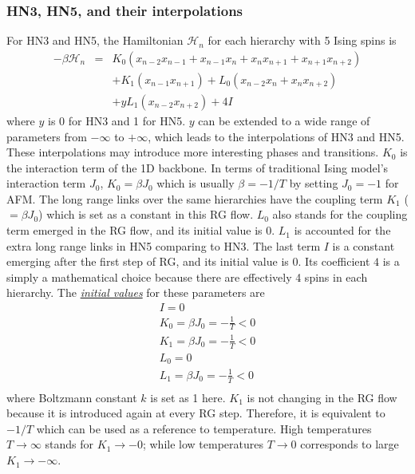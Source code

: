 \subsubsection{HN3, HN5, and their interpolations }
\label{sec:afm-HN35RG}

For HN3 and HN5, the Hamiltonian $\mathcal{H}_n$ for each hierarchy with 5 Ising spins is
\begin{eqnarray}
\label{eq:hn35-z0}
 -\beta \mathcal{H}_n &=& K_0 \left(x_{n-2}x_{n-1} + x_{n-1}x_{n} +  x_{n}x_{n+1} +  x_{n+1}x_{n+2}\right) \nonumber \\ 
   && + K_1(x_{n-1}x_{n+1}) + L_0(x_{n-2}x_{n} + x_{n}x_{n+2}) \nonumber \\
   && + y L_1 (x_{n-2} x_{n+2})  + 4I 
\end{eqnarray}
where $y$ is 0 for HN3 and 1 for HN5. $y$ can be extended to a wide range of parameters from $-\infty$ to $+\infty$, which leads to the interpolations of HN3 and HN5. These interpolations may introduce more interesting phases and transitions. $K_0$ is the interaction term of the 1D backbone. In terms of traditional Ising model's interaction term $J_0$, $K_0=\beta J_0$ which is usually $\beta=-1/T$ by setting $J_0=-1$ for AFM. The long range links over the same hierarchies have the coupling term $K_1$ ($=\beta J_0$) which is set as a constant in this RG flow. $L_0$ also stands for the coupling term emerged in the RG flow, and its initial value is 0. $L_1$ is accounted for the extra long range links in HN5 comparing to HN3. The last term $I$ is a constant emerging after the first step of RG, and its initial value is 0. Its coefficient $4$ is a simply a mathematical choice because there are effectively 4 spins in each hierarchy. The \underline{\emph{initial values}} for these parameters are
\begin{equation}
\begin{array}{l}
\displaystyle I = 0 \\
\displaystyle K_0 =\beta J_0=-\frac{1}{T} < 0 \\
\displaystyle K_1 =\beta J_0=-\frac{1}{T}  < 0 \\
\displaystyle L_0 = 0 \\
\displaystyle L_1 =\beta J_0 =-\frac{1}{T} < 0 \\
\end{array} 
\label{eq:hn35-init1}
\end{equation}
where Boltzmann constant $k$ is set as 1 here. $K_1$ is not changing in the RG flow because it is introduced again at every RG step. Therefore, it is equivalent to $-1/T$ which can be used as a reference to temperature. High temperatures $T \rightarrow \infty$ stands for $K_1\rightarrow -0$; while low temperatures $T\rightarrow 0$ corresponds to large $K_1 \rightarrow -\infty$.

